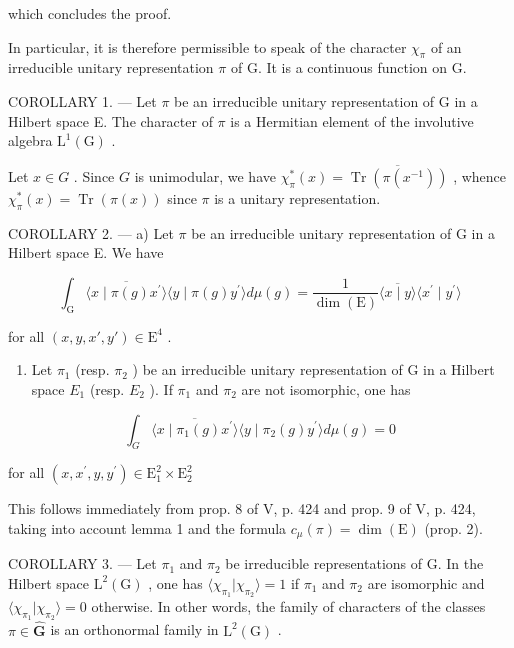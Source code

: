 which concludes the proof.

In particular, it is therefore permissible to speak of the character \(\chi_{\pi}\) of an irreducible unitary representation \(\pi\) of G. It is a continuous function on G.

COROLLARY 1. --- Let \(\pi\) be an irreducible unitary representation of G in a Hilbert space E. The character of \(\pi\) is a Hermitian element of the involutive algebra \(\mathrm{L}^{1}(\mathrm{G})\) .

Let \(x \in G\) . Since \(G\) is unimodular, we have \(\chi_{\pi}^{*}(x) = \overline{\operatorname{Tr}(\pi(x^{-1}))}\) , whence \(\chi_{\pi}^{*}(x) = \operatorname{Tr}(\pi(x))\) since \(\pi\) is a unitary representation.

COROLLARY 2. --- a) Let \(\pi\) be an irreducible unitary representation of G in a Hilbert space E. We have

\[
\int_ {\mathrm{G}} \overline {{\langle x \mid \pi (g) x ^ {\prime} \rangle}} \langle y \mid \pi (g) y ^ {\prime} \rangle d \mu (g) = \frac {1}{\dim (\mathrm{E})} \overline {{\langle x \mid y \rangle}} \langle x ^ {\prime} \mid y ^ {\prime} \rangle
\]

for all \((x,y,x',y')\in \mathrm{E}^4\) .

\begin{enumerate}
\def\labelenumi{\alph{enumi})}
\setcounter{enumi}{1}
\tightlist
\item
  Let \(\pi_{1}\) (resp. \(\pi_{2}\) ) be an irreducible unitary representation of G in a Hilbert space \(E_{1}\) (resp. \(E_{2}\) ). If \(\pi_{1}\) and \(\pi_{2}\) are not isomorphic, one has
\end{enumerate}

\[
\int_ {G} \overline {{\langle x \mid \pi_ {1} (g) x ^ {\prime} \rangle}} \langle y \mid \pi_ {2} (g) y ^ {\prime} \rangle d \mu (g) = 0
\]

for all \((x,x^{\prime},y,y^{\prime})\in \mathrm{E}_{1}^{2}\times \mathrm{E}_{2}^{2}\)

This follows immediately from prop. 8 of V, p. 424 and prop. 9 of V, p. 424, taking into account lemma 1 and the formula \(c_{\mu}(\pi) = \dim(\mathrm{E})\) (prop. 2).

COROLLARY 3. --- Let \(\pi_1\) and \(\pi_2\) be irreducible representations of G. In the Hilbert space \(\mathrm{L}^{2}(\mathrm{G})\) , one has \(\langle \chi_{\pi_1} | \chi_{\pi_2} \rangle = 1\) if \(\pi_1\) and \(\pi_2\) are isomorphic and \(\langle \chi_{\pi_1} | \chi_{\pi_2} \rangle = 0\) otherwise. In other words, the family of characters of the classes \(\pi \in \widehat{\mathbf{G}}\) is an orthonormal family in \(\mathrm{L}^{2}(\mathrm{G})\) .

